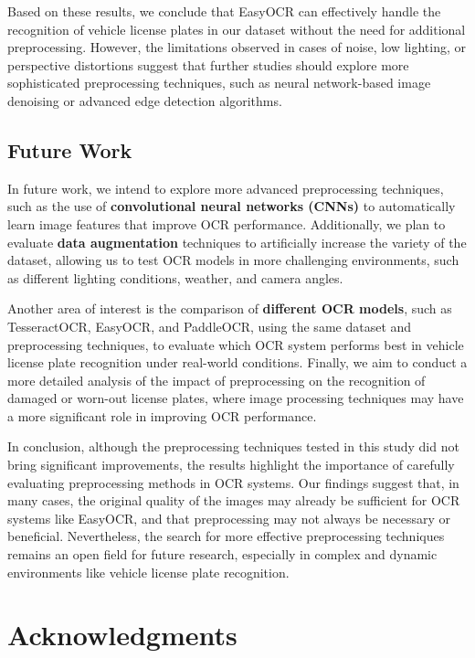 \documentclass[conference]{IEEEtran}
\begin{document}
	Based on these results, we conclude that EasyOCR can effectively handle the recognition of vehicle license plates in our dataset without the need for additional preprocessing. However, the limitations observed in cases of noise, low lighting, or perspective distortions suggest that further studies should explore more sophisticated preprocessing techniques, such as neural network-based image denoising or advanced edge detection algorithms.
	
	\subsection{Future Work}
	
	In future work, we intend to explore more advanced preprocessing techniques, such as the use of \textbf{convolutional neural networks (CNNs)} to automatically learn image features that improve OCR performance. Additionally, we plan to evaluate \textbf{data augmentation} techniques to artificially increase the variety of the dataset, allowing us to test OCR models in more challenging environments, such as different lighting conditions, weather, and camera angles.
	
	Another area of interest is the comparison of \textbf{different OCR models}, such as TesseractOCR, EasyOCR, and PaddleOCR, using the same dataset and preprocessing techniques, to evaluate which OCR system performs best in vehicle license plate recognition under real-world conditions. Finally, we aim to conduct a more detailed analysis of the impact of preprocessing on the recognition of damaged or worn-out license plates, where image processing techniques may have a more significant role in improving OCR performance.
	
	In conclusion, although the preprocessing techniques tested in this study did not bring significant improvements, the results highlight the importance of carefully evaluating preprocessing methods in OCR systems. Our findings suggest that, in many cases, the original quality of the images may already be sufficient for OCR systems like EasyOCR, and that preprocessing may not always be necessary or beneficial. Nevertheless, the search for more effective preprocessing techniques remains an open field for future research, especially in complex and dynamic environments like vehicle license plate recognition.
	
	\section*{Acknowledgments}
	
\end{document}
